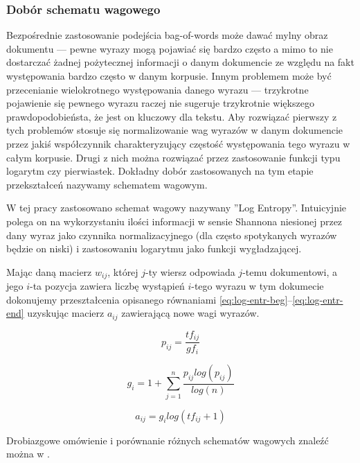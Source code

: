 \documentclass[11pt,a4paper]{article}
\begin{document}
\subsubsection{Dobór schematu wagowego}
\label{weighting}

Bezpośrednie zastosowanie podejścia bag-of-words może dawać mylny obraz
dokumentu --- pewne wyrazy mogą pojawiać się bardzo często a mimo to nie
dostarczać żadnej pożytecznej informacji o danym dokumencie ze względu na fakt
występowania bardzo często w danym korpusie. Innym problemem może być
przecenianie wielokrotnego występowania danego wyrazu --- trzykrotne pojawienie
się pewnego wyrazu raczej nie sugeruje trzykrotnie większego prawdopodobieństa,
że jest on kluczowy dla tekstu. Aby rozwiązać pierwszy z tych problemów stosuje
się normalizowanie wag wyrazów w danym dokumencie przez jakiś współczynnik
charakteryzujący częstość występowania tego wyrazu w całym korpusie. Drugi z
nich można rozwiązać przez zastosowanie funkcji typu logarytm czy pierwiastek.
Dokładny dobór zastosowanych na tym etapie przekształceń nazywamy schematem
wagowym.

W tej pracy zastosowano schemat wagowy nazywany ''Log Entropy''.  Intuicyjnie
polega on na wykorzystaniu ilości informacji w sensie Shannona niesionej przez
dany wyraz jako czynnika normalizacyjnego (dla często spotykanych wyrazów
będzie on niski) i zastosowaniu logarytmu jako funkcji wygładzającej.

Mając daną macierz $w_{ij}$, której $j$-ty wiersz odpowiada $j$-temu
dokumentowi, a jego $i$-ta pozycja zawiera liczbę wystąpień $i$-tego wyrazu w
tym dokumecie dokonujemy przeształcenia opisanego równaniami
\ref{eq:log-entr-beg}--\ref{eq:log-entr-end} uzyskując macierz $a_{ij}$
zawierającą nowe wagi wyrazów.

\begin{equation}
  \label{eq:log-entr-beg}
  p_{ij} = \frac{tf_{ij}}{gf_i}
\end{equation}

\begin{equation}
  g_i = 1 + \sum_{j=1}^n \frac{p_{ij} log(p_{ij})}{log(n)}
\end{equation}

\begin{equation}
  \label{eq:log-entr-end}
  a_{ij} = g_i log(tf_{ij} + 1)
\end{equation}

Drobiazgowe omówienie i porównanie różnych schematów wagowych znaleźć moż\-na w
\cite{figiel}.
\end{document}
